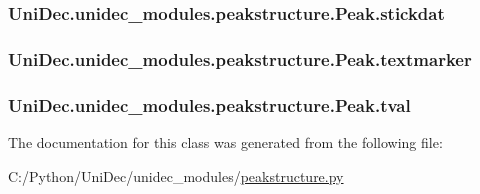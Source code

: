 \subsubsection[{stickdat}]{\setlength{\rightskip}{0pt plus 5cm}Uni\+Dec.\+unidec\+\_\+modules.\+peakstructure.\+Peak.\+stickdat}\label{class_uni_dec_1_1unidec__modules_1_1peakstructure_1_1_peak_aac324699104efdb5d6a2558f28e33a27}
\hypertarget{class_uni_dec_1_1unidec__modules_1_1peakstructure_1_1_peak_a67063685fc09f6ac8329d967b72211d1}{}
\subsubsection[{textmarker}]{\setlength{\rightskip}{0pt plus 5cm}Uni\+Dec.\+unidec\+\_\+modules.\+peakstructure.\+Peak.\+textmarker}\label{class_uni_dec_1_1unidec__modules_1_1peakstructure_1_1_peak_a67063685fc09f6ac8329d967b72211d1}
\hypertarget{class_uni_dec_1_1unidec__modules_1_1peakstructure_1_1_peak_a7df3e12b506c416cb9ed9e5d8d458be6}{}
\subsubsection[{tval}]{\setlength{\rightskip}{0pt plus 5cm}Uni\+Dec.\+unidec\+\_\+modules.\+peakstructure.\+Peak.\+tval}\label{class_uni_dec_1_1unidec__modules_1_1peakstructure_1_1_peak_a7df3e12b506c416cb9ed9e5d8d458be6}


The documentation for this class was generated from the following file\+:\begin{DoxyCompactItemize}
\item 
C\+:/\+Python/\+Uni\+Dec/unidec\+\_\+modules/\hyperlink{peakstructure_8py}{peakstructure.\+py}\end{DoxyCompactItemize}
